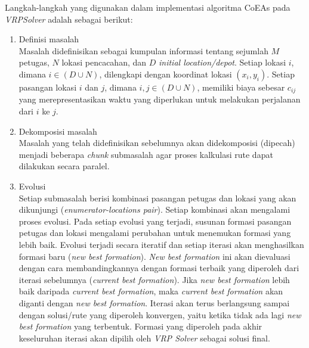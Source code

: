 Langkah-langkah yang digunakan dalam implementasi algoritma CoEAs pada \textit{VRPSolver} adalah sebagai berikut:
\begin{enumerate}
\item Definisi masalah \\
Masalah didefinisikan sebagai kumpulan informasi tentang sejumlah $M$ petugas, $N$ lokasi pencacahan, dan $D$ \textit{initial location/depot}. Setiap lokasi $i$, dimana $i \in (D \cup N)$, dilengkapi dengan koordinat lokasi $(x_i, y_i)$. Setiap pasangan lokasi $i$ dan $j$, dimana $i, j \in (D \cup N)$, memiliki biaya sebesar $c_{ij}$ yang merepresentasikan waktu yang diperlukan untuk melakukan perjalanan dari $i$ ke $j$. 

\item Dekomposisi masalah \\
Masalah yang telah didefinisikan sebelumnya akan didekomposisi (dipecah) menjadi beberapa \textit{chunk} submasalah agar proses kalkulasi rute dapat dilakukan secara paralel. 

\item Evolusi \\
Setiap submasalah berisi kombinasi pasangan petugas dan lokasi yang akan dikunjungi (\textit{enumerator-locations pair}). Setiap kombinasi akan mengalami proses evolusi. Pada setiap evolusi yang terjadi, susunan formasi pasangan petugas dan lokasi mengalami perubahan untuk menemukan formasi yang lebih baik. Evolusi terjadi secara iteratif dan setiap iterasi akan menghasilkan formasi baru (\textit{new best formation}). \textit{New best formation} ini akan dievaluasi dengan cara membandingkannya dengan formasi terbaik yang diperoleh dari iterasi sebelumnya (\textit{current best formation}). Jika \textit{new best formation} lebih baik daripada \textit{current best formation}, maka \textit{current best formation} akan diganti dengan \textit{new best formation}. Iterasi akan terus berlangsung sampai dengan solusi/rute yang diperoleh konvergen, yaitu ketika tidak ada lagi \textit{new best formation} yang terbentuk. Formasi yang diperoleh pada akhir keseluruhan iterasi akan dipilih oleh \textit{VRP Solver} sebagai solusi final. 
\end{enumerate}


